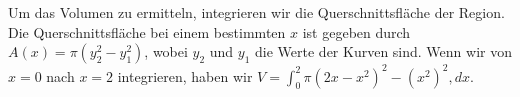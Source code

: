 Um das Volumen zu ermitteln, integrieren wir die Querschnittsfläche der Region.
Die Querschnittsfläche bei einem bestimmten $x$ ist gegeben durch $A(x) = \pi(y_2^2 - y_1^2)$, wobei $y_2$ und $y_1$ die Werte der Kurven sind.
Wenn wir von $x = 0$ nach $x = 2$ integrieren, haben wir $V = \int_{0}^{2} \pi(2x - x^2)^2 - (x^2)^2, dx$.
